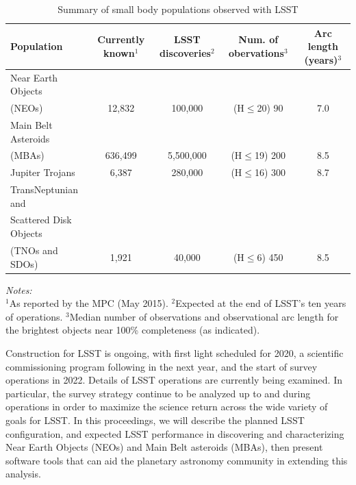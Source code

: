 \documentclass{iau}
\begin{document}
\begin{table}
\begin{center}
\caption{Summary of small body populations observed with LSST}
\label{table1}
 {\scriptsize
  \begin{tabular}{|l|c|c|c|c|}\hline
Population & Currently known$^1$ &  LSST discoveries$^2$ &
Num. of obervations$^3$
    & Arc length (years)$^3$ \\ \hline
Near Earth Objects \\(NEOs) & 12,832 & 100,000 & (H$\leq$20) 90 & 7.0 \\
    \hline
Main Belt Asteroids \\(MBAs) & 636,499 & 5,500,000 & (H$\leq$19) 200 &
                                                                     8.5
    \\ \hline
Jupiter Trojans & 6,387 & 280,000 & (H$\leq$16) 300 & 8.7 \\ \hline
TransNeptunian and \\ Scattered Disk Objects \\ (TNOs and SDOs) & 1,921 &
                                                                    40,000
                                                                          &
                                                                            (H$\leq$6)
                                                                            450
    & 8.5 \\ \hline
 \end{tabular}
  }
 \end{center}
\vspace{1mm}
 \scriptsize{
 {\it Notes:}\\
  $^1$As reported by the MPC (May 2015).
  $^2$Expected at the end of LSST's ten years of operations.
  $^3$Median number of observations and observational arc length for the brightest objects near
  100\% completeness (as indicated). }
\end{table}

Construction for LSST is ongoing, with first light scheduled for 2020,
a scientific commissioning program following in the next year, and the
start of survey operations in 2022. Details of LSST operations are
currently being examined. In particular, the survey strategy continue
to be analyzed up to and during operations in order to maximize the
science return across the wide variety of goals for LSST. In this
proceedings, we will describe the planned LSST configuration, and
expected LSST performance in discovering and characterizing Near Earth
Objects (NEOs) and Main Belt asteroids (MBAs), then present software
tools that can aid the planetary astronomy community in extending
this analysis.
\end{document}
